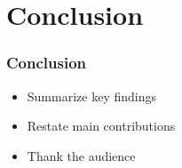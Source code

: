 \documentclass{beamer}
\begin{document}
\section{Conclusion}
\begin{frame}
\frametitle{Conclusion}
\begin{itemize}
    \item Summarize key findings
    \item Restate main contributions
    \item Thank the audience
\end{itemize}
\end{frame}
\end{document}
